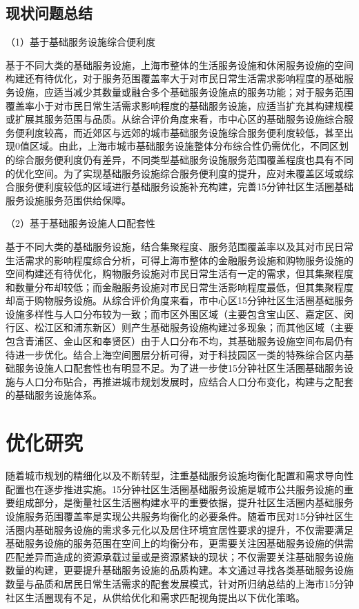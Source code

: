 \documentclass{shnuthesis}
\begin{document}
\subsection{现状问题总结}

（1）基于基础服务设施综合便利度

基于不同大类的基础服务设施，上海市整体的生活服务设施和休闲服务设施的空间构建还有待优化，对于服务范围覆盖率大于对市民日常生活需求影响程度的基础服务设施，应适当减少其数量或融合多个基础服务设施点的服务功能；对于服务范围覆盖率小于对市民日常生活需求影响程度的基础服务设施，应适当扩充其构建规模或扩展其服务范围与品质。从综合评价角度来看，市中心区的基础服务设施综合服务便利度较高，而近郊区与远郊的城市基础服务设施综合服务便利度较低，甚至出现0值区域。由此，上海市城市基础服务设施整体分布综合性仍需优化，不同区划的综合服务便利度仍有差异，不同类型基础服务设施服务范围覆盖程度也具有不同的优化空间。为了实现基础服务设施综合服务便利度的提升，应对未覆盖区域或综合服务便利度较低的区域进行基础服务设施补充构建，完善15分钟社区生活圈基础服务设施服务范围供给保障。

（2）基于基础服务设施人口配套性

基于不同大类的基础服务设施，结合集聚程度、服务范围覆盖率以及其对市民日常生活需求的影响程度综合分析，可得上海市整体的金融服务设施和购物服务设施的空间构建还有待优化，购物服务设施对市民日常生活有一定的需求，但其集聚程度和数量分布却较低；而金融服务设施对市民日常生活影响程度最低，但其集聚程度却高于购物服务设施。从综合评价角度来看，市中心区15分钟社区生活圈基础服务设施多样性与人口分布较为一致；而市区外围区域（主要包含宝山区、嘉定区、闵行区、松江区和浦东新区）则产生基础服务设施构建过多现象；而其他区域（主要包含青浦区、金山区和奉贤区）由于人口分布不均，其基础服务设施空间布局仍有待进一步优化。结合上海空间圈层分析可得，对于科技园区一类的特殊综合区内基础服务设施人口配套性也有明显不足。为了进一步使15分钟社区生活圈基础服务设施与人口分布贴合，再推进城市规划发展时，应结合人口分布变化，构建与之配套的基础服务设施体系。

\section{优化研究}

随着城市规划的精细化以及不断转型，注重基础服务设施均衡化配置和需求导向性配置也在逐步推进实施。15分钟社区生活圈基础服务设施是城市公共服务设施的重要组成部分，是衡量社区生活圈构建水平的重要依据，提升社区生活圈内基础服务设施服务范围覆盖率是实现公共服务均衡化的必要条件。随着市民对15分钟社区生活圈内基础服务设施的需求多元化以及居住环境宜居性要求的提升，不仅需要满足基础服务设施的服务范围在空间上的均衡分布，更需要关注因基础服务设施的供需匹配差异而造成的资源承载过量或是资源紧缺的现状；不仅需要关注基础服务设施数量的构建，更要提升基础服务设施的品质构建。本文通过寻找各类基础服务设施数量与品质和居民日常生活需求的配套发展模式，针对所归纳总结的上海市15分钟社区生活圈现有不足，从供给优化和需求匹配视角提出以下优化策略。
\end{document}
